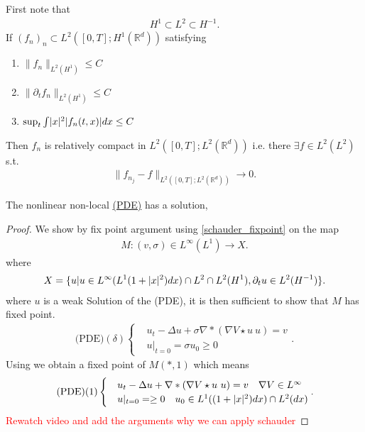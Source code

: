    \begin{lemma}\label{aubin}
    First note that
   \begin{align*}
    H^{1} \subset  L^{2}   \subset  H^{-1} 
   .\end{align*} 
   If  $(f_n)_n \subset  L^{2}([0,T];H^{1}(\mathbb{R}^{d} ) ) $ satisfying 
   \begin{enumerate}
     \item  $\|f_n\|_{L^{2}(H^{1} ) }\le C$ 
     \item $\|\partial_t f_n\|_{L^{2}(H^{1} ) }\le C$
     \item $\sup_t \int  \lvert x\rvert^2 \lvert f_n(t,x)\rvert dx \le C$
   \end{enumerate}
   Then $f_n$ is relatively compact in $L^{2}([0,T];L^{2}(\mathbb{R}^{d} ) ) $ i.e. there $\exists  f \in  L^{2}(L^{2} ) $ s.t.
   \begin{align*}
     \|f_{n_j} - f\|_{L^{2}([0,T];L^{2}(\mathbb{R}^{d} ) ) } \to 0
   .\end{align*}
   \end{lemma}
   \begin{theorem}
    The nonlinear non-local \hyperref[pde_mve_apprach]{(PDE)} has a solution,
   \end{theorem}
   \begin{proof}
     We show by fix point argument using \autoref{schauder_fixpoint} on the map
    \begin{align*}
      M : (v,\sigma) \in  L^{\infty}(L^{1} ) \to X
    .\end{align*}
    where  
    \begin{align*}
      X = \{u | u \in  L^{\infty}(L^{1}(1+\lvert x\rvert^2) dx) \cap L^2  \cap L^2(H^{1}), \partial_t u \in  L^2(H^{-1} )\}  
    .\end{align*}
    where $u$ is a weak Solution of the (PDE), it is then sufficient to show that $M$ has fixed point.\\
\begin{align*}
  \text{(PDE)}(\delta)\begin{cases}
    &u_t - \Delta u + \sigma \nabla*(\nabla V \star  u \ u) = v\\
    &u \rvert_{t=0} = \sigma u_{0}  \ge 0
  \end{cases}
 .\end{align*}
 Using  we obtain a fixed point of $M(*,1)$ which means 
 \begin{align*}
 \text{(PDE)}(1) \begin{cases}
    &u_t - \Delta u + \nabla*(\nabla V \star  u \ u) = v \quad \nabla V \in  L^{\infty} \\
    &u \rvert_{t=0} =  \ge 0 \quad u_{0} \in  L^{1}((1+\lvert x\rvert^2)dx) \cap L^{2}(dx) 
  \end{cases}
 .\end{align*}
 \textcolor{Red}{Rewatch video and add the arguments why we can apply schauder}
\end{proof}
